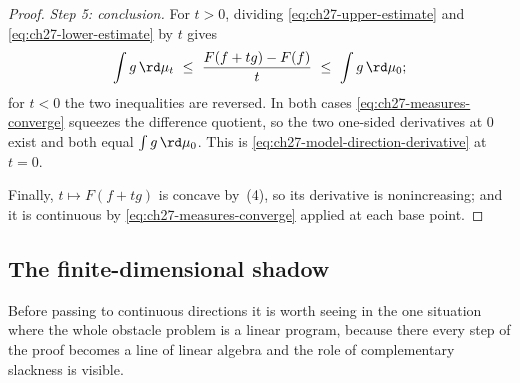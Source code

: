 \begin{proof}
\emph{Step 5: conclusion.}
For $t>0$, dividing \eqref{eq:ch27-upper-estimate} and
\eqref{eq:ch27-lower-estimate} by $t$ gives
\[
 \int g\,\rd\mu_t
 \ \leq\ \frac{F(f+tg)-F(f)}{t}
 \ \leq\ \int g\,\rd\mu_0 ;
\]
for $t<0$ the two inequalities are reversed.  In both cases
\eqref{eq:ch27-measures-converge} squeezes the difference quotient, so the
two one-sided derivatives at $0$ exist and both equal
$\int g\,\rd\mu_0$.  This is
\eqref{eq:ch27-model-direction-derivative} at $t=0$.

Finally, $t\mapsto F(f+tg)$ is concave by
\,(4), so its derivative is nonincreasing; and
it is continuous by \eqref{eq:ch27-measures-converge} applied at each base
point.
\end{proof}

\begin{center}
\end{center}

\subsection{The finite-dimensional shadow}
\label{sec:ch27-finite-shadow}

Before passing to continuous directions it is worth seeing
 in the one situation where
the whole obstacle problem is a linear program, because there every step of
the proof becomes a line of linear algebra and the role of complementary
slackness is visible.

